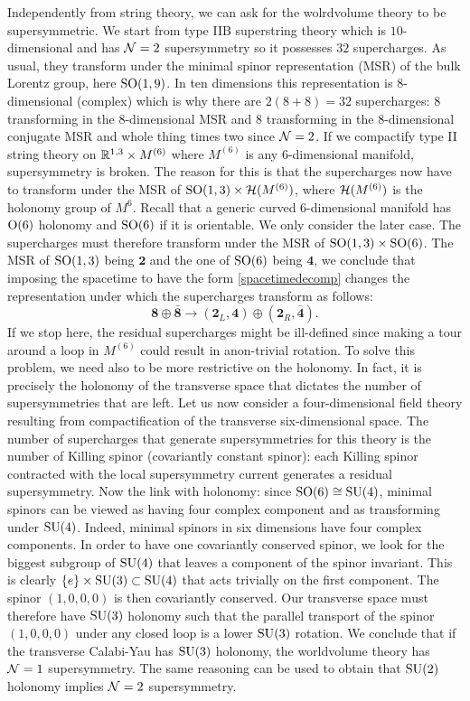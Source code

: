         Independently from string theory, we can ask for the wolrdvolume theory to be supersymmetric. We start from type IIB superstring theory which is $10$-dimensional and has $\mathcal{N}=2$ supersymmetry so it possesses $32$ supercharges. As usual, they transform under the minimal spinor representation (MSR) of the bulk Lorentz group, here $\text{SO}(1,9)$. In ten dimensions this representation is $8$-dimensional (complex) which is why there are $2(8+8)=32$ supercharges: $8$ transforming in the $8$-dimensional MSR and $8$ transforming in the $8$-dimensional conjugate MSR and whole thing times two since $\mathcal{N}=2$. If we compactify type II string theory on $\mathbb{R}^{1,3}\times M^{(6)}$ where $M^{(6)}$ is any $6$-dimensional manifold, supersymmetry is broken. The reason for this is that the supercharges now have to transform under the MSR of $\text{SO}(1,3)\times\mathcal{H}(M^{(6)})$, where $\mathcal{H}(M^{(6)})$ is the holonomy group of $M^{6}$. Recall that a generic curved 6-dimensional manifold has $\text{O}(6)$ holonomy and $\text{SO}(6)$ if it is orientable. We only consider the later case. The supercharges must therefore transform under the MSR of $\text{SO}(1,3)\times\text{SO}(6)$. The MSR of $\text{SO}(1,3)$ being $\boldsymbol{2}$ and the one of $\text{SO}(6)$ being $\boldsymbol{4}$, we conclude that imposing the spacetime to have the form \eqref{spacetimedecomp} changes the representation under which the supercharges transform as follows:
        \begin{equation}
            \boldsymbol{8}\oplus\bar{\boldsymbol{8}}\to (\boldsymbol{2}_L,\boldsymbol{4})\oplus(\boldsymbol{2}_R,\bar{\boldsymbol{4}}).
        \end{equation}
        If we stop here, the residual supercharges might be ill-defined since making a tour around a loop in $M^{(6)}$ could result in anon-trivial rotation. To solve this problem, we need also to be more restrictive on the holonomy. In fact, it is precisely the holonomy of the transverse space that dictates the number of supersymmetries that are left. Let us now consider a four-dimensional field theory resulting from compactification of the transverse six-dimensional space. The number of supercharges that generate supersymmetries for this theory is the number of Killing spinor (covariantly constant spinor): each Killing spinor contracted with the local supersymmetry current generates a residual supersymmetry.  Now the link with holonomy: since $\text{SO}(6)\cong\text{SU}(4)$, minimal spinors can be viewed as having four complex component and as transforming under $\text{SU}(4)$. Indeed, minimal spinors in six dimensions have four complex components. In order to have one covariantly conserved spinor, we look for the biggest subgroup of $\text{SU}(4)$ that leaves a component of the spinor invariant. This is clearly $\{e\}\times\text{SU}(3)\subset\text{SU}(4)$ that acts trivially on the first component. The spinor $(1,0,0,0)$ is then covariantly conserved. Our transverse space must therefore have $\text{SU}(3)$ holonomy such that the parallel transport of the spinor $(1,0,0,0)$ under any closed loop is a lower $\text{SU}(3)$ rotation. We conclude that if the transverse Calabi-Yau has $\text{SU}(3)$ holonomy, the worldvolume theory has $\mathcal{N}=1$ supersymmetry. The same reasoning can be used to obtain that $\text{SU}(2)$ holonomy implies $\mathcal{N}=2$ supersymmetry.

